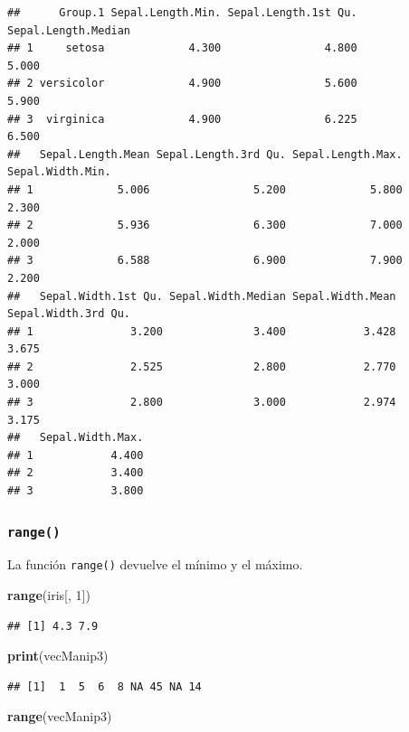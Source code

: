 \documentclass[
]{book}
\newenvironment{Shaded}{\begin{snugshade}}{\end{snugshade}}
\newcommand{\DecValTok}[1]{\textcolor[rgb]{0.00,0.00,0.81}{#1}}
\newcommand{\KeywordTok}[1]{\textcolor[rgb]{0.13,0.29,0.53}{\textbf{#1}}}
\newcommand{\NormalTok}[1]{#1}
\begin{document}
\begin{verbatim}
##      Group.1 Sepal.Length.Min. Sepal.Length.1st Qu. Sepal.Length.Median
## 1     setosa             4.300                4.800               5.000
## 2 versicolor             4.900                5.600               5.900
## 3  virginica             4.900                6.225               6.500
##   Sepal.Length.Mean Sepal.Length.3rd Qu. Sepal.Length.Max. Sepal.Width.Min.
## 1             5.006                5.200             5.800            2.300
## 2             5.936                6.300             7.000            2.000
## 3             6.588                6.900             7.900            2.200
##   Sepal.Width.1st Qu. Sepal.Width.Median Sepal.Width.Mean Sepal.Width.3rd Qu.
## 1               3.200              3.400            3.428               3.675
## 2               2.525              2.800            2.770               3.000
## 3               2.800              3.000            2.974               3.175
##   Sepal.Width.Max.
## 1            4.400
## 2            3.400
## 3            3.800
\end{verbatim}

\hypertarget{l015range}{%
\subsubsection{\texorpdfstring{\texttt{range()}}{range()}}\label{l015range}}

La función \texttt{range()} devuelve el mínimo y el máximo.

\begin{Shaded}
\begin{Highlighting}[]
\KeywordTok{range}\NormalTok{(iris[, }\DecValTok{1}\NormalTok{])}
\end{Highlighting}
\end{Shaded}

\begin{verbatim}
## [1] 4.3 7.9
\end{verbatim}

\begin{Shaded}
\begin{Highlighting}[]
\KeywordTok{print}\NormalTok{(vecManip3)}
\end{Highlighting}
\end{Shaded}

\begin{verbatim}
## [1]  1  5  6  8 NA 45 NA 14
\end{verbatim}

\begin{Shaded}
\begin{Highlighting}[]
\KeywordTok{range}\NormalTok{(vecManip3)}
\end{Highlighting}
\end{Shaded}
\end{document}
